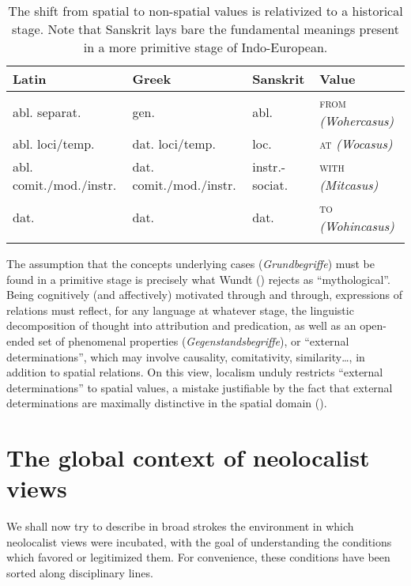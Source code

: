 \documentclass[english,output=paper,colorlinks,citecolor=brown]{../langscibook}
\begin{document}
\begin{table}
\begin{tabularx}{\textwidth}{QQll}
\lsptoprule
Latin & Greek & Sanskrit  & Value\\\midrule
abl. separat. & gen. & abl. & \textsc{from} \textit{(Wohercasus)}\\ 
abl. loci\slash temp. & dat. loci\slash temp. & loc. & \textsc{at} \textit{(Wocasus)}\\
abl. comit.\slash mod.\slash instr. & dat. comit.\slash mod.\slash instr. & instr.-sociat. & \textsc{with} \textit{(Mitcasus)}\\
dat. & dat. & dat.  & \textsc{to} \textit{(Wohincasus)}\\
\lspbottomrule
\end{tabularx}
\caption{The shift from spatial to non-spatial values is relativized to a historical stage. Note that Sanskrit lays bare the fundamental meanings present in a more primitive stage of Indo-European.}
\end{table}

The assumption that the concepts underlying cases (\textit{Grundbegriffe}) must be found in a primitive stage is precisely what Wundt (\citealt{Wundt1912}) rejects as “mythological”. Being cognitively (and affectively) motivated through and through, expressions of relations must reflect, for any language at whatever stage, the linguistic decomposition of thought into attribution and predication, as well as an open-ended set of phenomenal properties (\textit{Gegenstandsbegriffe}), or “external determinations”, which may involve causality, comitativity, similarity…, in addition to spatial relations. On this view, localism unduly restricts “external determinations” to spatial values, a mistake justifiable by the fact that external determinations are maximally distinctive in the spatial domain (\citealt[115]{Wundt1912}).

\section{The global context of neolocalist views}
We shall now try to describe in broad strokes the environment in which neolocalist views were incubated, with the goal of understanding the conditions which favored or legitimized them. For convenience, these conditions have been sorted along disciplinary lines. 
\end{document}
